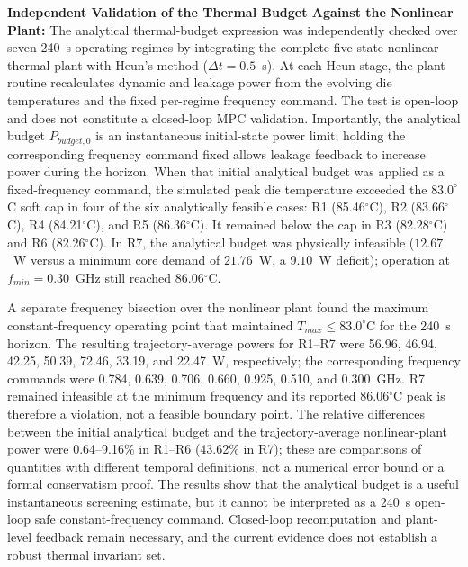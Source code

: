 \documentclass[a4paper,fleqn]{cas-dc}
\begin{document}
\textbf{Independent Validation of the Thermal Budget Against the Nonlinear Plant:}
The analytical thermal-budget expression was independently checked over seven 240~s operating regimes by integrating the complete five-state nonlinear thermal plant with Heun's method ($\Delta t=0.5$~s). At each Heun stage, the plant routine recalculates dynamic and leakage power from the evolving die temperatures and the fixed per-regime frequency command. The test is open-loop and does not constitute a closed-loop MPC validation. Importantly, the analytical budget $P_{budget,0}$ is an instantaneous initial-state power limit; holding the corresponding frequency command fixed allows leakage feedback to increase power during the horizon. When that initial analytical budget was applied as a fixed-frequency command, the simulated peak die temperature exceeded the $83.0^\circ$C soft cap in four of the six analytically feasible cases: R1 (85.46$^\circ$C), R2 (83.66$^\circ$C), R4 (84.21$^\circ$C), and R5 (86.36$^\circ$C). It remained below the cap in R3 (82.28$^\circ$C) and R6 (82.26$^\circ$C). In R7, the analytical budget was physically infeasible ($12.67$~W versus a minimum core demand of $21.76$~W, a $9.10$~W deficit); operation at $f_{min}=0.30$~GHz still reached 86.06$^\circ$C.

A separate frequency bisection over the nonlinear plant found the maximum constant-frequency operating point that maintained $T_{max}\leq83.0^\circ$C for the 240~s horizon. The resulting trajectory-average powers for R1--R7 were 56.96, 46.94, 42.25, 50.39, 72.46, 33.19, and 22.47~W, respectively; the corresponding frequency commands were 0.784, 0.639, 0.706, 0.660, 0.925, 0.510, and 0.300~GHz. R7 remained infeasible at the minimum frequency and its reported 86.06$^\circ$C peak is therefore a violation, not a feasible boundary point. The relative differences between the initial analytical budget and the trajectory-average nonlinear-plant power were 0.64--9.16\% in R1--R6 (43.62\% in R7); these are comparisons of quantities with different temporal definitions, not a numerical error bound or a formal conservatism proof. The results show that the analytical budget is a useful instantaneous screening estimate, but it cannot be interpreted as a 240~s open-loop safe constant-frequency command. Closed-loop recomputation and plant-level feedback remain necessary, and the current evidence does not establish a robust thermal invariant set.
\end{document}
